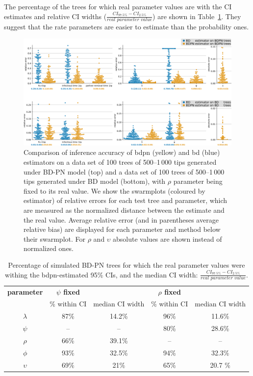 \documentclass[a4paper,10pt]{article}
\begin{document}

The percentage of the trees for which real parameter values are with the CI estimates and relative CI widths ($\frac{CI_{97.5\%} - CI_{2.5\%}}{\textit{real parameter value}}$) are shown in Table~\ref{tbl:ci}. They suggest that the rate parameters are easier to estimate than the probability ones.

\begin{figure}[!pht]
\centering 
\includegraphics[width=1\textwidth]{Fig_errors_p.png}
\caption{Comparison of inference accuracy of bdpn (yellow) and bd (blue) estimators on a data set of 100 trees of 500--1\,000 tips generated under BD-PN model (top) and a data set of 100 trees of 500--1\,000 tips generated under BD model (bottom), with $\rho$ parameter being fixed to its real value.
We show the swarmplots (coloured by estimator) of relative errors for each test tree and parameter, which are measured as the normalized distance between the estimate and the real value. Average relative error (and in parentheses average relative bias) are displayed for each parameter and method below their swarmplot. For $\rho$ and $\upsilon$ absolute values are shown instead of normalized ones. } 
\label{fig:sim} 
\end{figure}
 
 \begin{table}[!h]\centering
\small
\caption{Percentage of simulated BD-PN trees for which the real parameter values were withing the bdpn-estimated 95\% CIs, and the median CI width: $\frac{CI_{97.5\%} - CI_{2.5\%}}{\textit{real parameter value}}$. \smallskip}
\begin{tabular}{c|cc|cc}
\textbf{parameter} & \textbf{$\psi$ fixed} & & \textbf{$\rho$ fixed} &  \\
 & \% within CI & median CI width & \% within CI & median CI width  \\
\toprule 
 $\lambda$ &  87\% & 14.2\% & 96\% & 11.6\%\\
 $\psi$ & -- & -- & 80\% & 28.6\% \\
 $\rho$ & 66\%  & 39.1\% & -- & -- \\
 $\phi$ & 93\% & 32.5\% & 94\% & 32.3\% \\
 $\upsilon$ & 69\% & 21\% & 65\% & 20.7 \% \\
\bottomrule
\end{tabular}
\label{tbl:ci}
\end{table}
\end{document}
